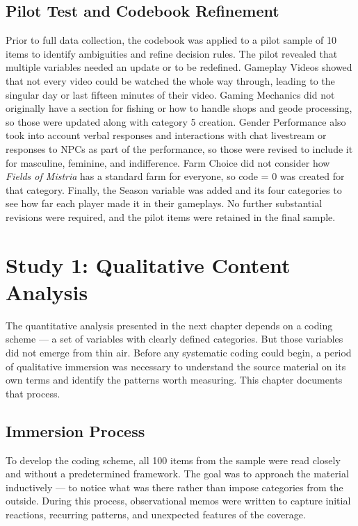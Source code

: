 \documentclass[
  12pt,
  letterpaper,
  DIV=11,
  numbers=noendperiod]{scrreprt}
\begin{document}
\section{Pilot Test and Codebook
Refinement}\label{pilot-test-and-codebook-refinement}

Prior to full data collection, the codebook was applied to a pilot
sample of 10 items to identify ambiguities and refine decision rules.
The pilot revealed that multiple variables needed an update or to be
redefined. Gameplay Videos showed that not every video could be watched
the whole way through, leading to the singular day or last fifteen
minutes of their video. Gaming Mechanics did not originally have a
section for fishing or how to handle shops and geode processing, so
those were updated along with category 5 creation. Gender Performance
also took into account verbal responses and interactions with chat
livestream or responses to NPCs as part of the performance, so those
were revised to include it for masculine, feminine, and indifference.
Farm Choice did not consider how \emph{Fields of Mistria} has a standard
farm for everyone, so code = 0 was created for that category. Finally,
the Season variable was added and its four categories to see how far
each player made it in their gameplays. No further substantial revisions
were required, and the pilot items were retained in the final sample.


\chapter{Study 1: Qualitative Content
Analysis}\label{study-1-qualitative-content-analysis}

The quantitative analysis presented in the next chapter depends on a
coding scheme --- a set of variables with clearly defined categories.
But those variables did not emerge from thin air. Before any systematic
coding could begin, a period of qualitative immersion was necessary to
understand the source material on its own terms and identify the
patterns worth measuring. This chapter documents that process.

\section{Immersion Process}\label{immersion-process}

To develop the coding scheme, all 100 items from the sample were read
closely and without a predetermined framework. The goal was to approach
the material inductively --- to notice what was there rather than impose
categories from the outside. During this process, observational memos
were written to capture initial reactions, recurring patterns, and
unexpected features of the coverage.
\end{document}
